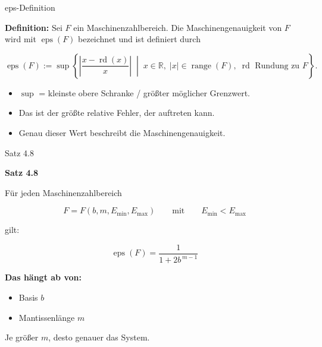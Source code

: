 \documentclass{beamer}
\begin{document}
\begin{frame}{eps-Definition}

\scriptsize

\textbf{Definition:} Sei \(F\) ein Maschinenzahlbereich.  
Die Maschinengenauigkeit von \(F\) wird mit \(\operatorname{eps}(F)\) bezeichnet und ist definiert durch

\vspace{0.4cm}

\[
\operatorname{eps}(F):=
\sup \left\{
\left|\frac{x-\operatorname{rd}(x)}{x}\right|
\;\middle|\;
x\in\mathbb{R},\;
|x|\in \operatorname{range}(F),\;
\operatorname{rd}\text{ Rundung zu }F
\right\}.
\]

\vspace{0.5cm}

\small

\begin{itemize}
\item \(\sup\) = kleinste obere Schranke / größter möglicher Grenzwert.
\item Das ist der größte relative Fehler, der auftreten kann.
\item Genau dieser Wert beschreibt die Maschinengenauigkeit.
\end{itemize}

\end{frame}


\begin{frame}{Satz 4.8}

\small

\textbf{Satz 4.8}

Für jeden Maschinenzahlbereich

\[
F = F(b,m,E_{\min},E_{\max})
\qquad\text{mit}\qquad
E_{\min}<E_{\max}
\]

gilt:

\vspace{0.6cm}

\[
\operatorname{eps}(F)=\frac{1}{1+2b^{\,m-1}}
\]

\vspace{0.6cm}

\textbf{Das hängt ab von:}

\begin{itemize}
\item Basis \(b\)
\item Mantissenlänge \(m\)
\end{itemize}

\vspace{0.3cm}

Je größer \(m\), desto genauer das System.

\end{frame}
\end{document}
